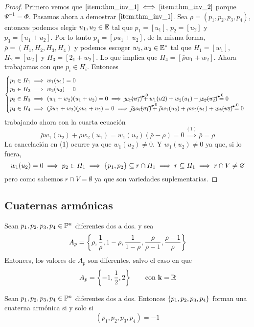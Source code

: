 \begin{proof}
 Primero vemos que $\ref{item:thm_inv_1} \iff \ref{item:thm_inv_2}$ porque $\Psi^{-1}=\Phi$. Pasamos ahora
 a demostrar $\ref{item:thm_inv_1}$. Sea $\rho = (p_1,p_2,p_3,p_4)$, entonces podemos elegir $u_1,u_2 \in \mathbb{E}$
 tal que $p_1 = [u_1]$, $p_2=[u_2]$ y $p_3=[u_1+u_2]$. Por lo tanto $p_4 = [\rho u_1+u_2]$, de la misma forma,
 $\bar{\rho} = (H_1,H_2,H_3,H_4)$ y podemos escoger $w_1,w_2 \in \mathbb{E}^*$ tal que $H_1 = [w_1]$, $H_2 = [w_2]$ y
 $H_3=[2_1+w_2]$. Lo que implica que $H_4 = [\bar{\rho} w_1 + w_2]$. Ahora trabajamos con que $p_i \in H_i$.
 Entonces
 \[
  \begin{cases}
    p_1 \in H_1 \implies w_1(u_1) = 0 \\
    p_2 \in H_2 \implies w_2(u_2) = 0 \\
    p_3 \in H_3 \implies (w_1+w_2)(u_1+u_2) = 0 \implies \cancelto{0}{w_1(u_1)} + w_1(u2) + w_2(u_1) + \cancelto{0}{w_2(u_2)} = 0 \\
    p_4 \in H_4 \implies (\bar{\rho}w_1+w_2)(\rho u_1+u_2) = 0 \implies \cancelto{0}{\bar{\rho}w_1(u_1)} + \bar{\rho}w_1(u_2) +
      \rho w_2(u_1) + \cancelto{0}{w_2(u_2)} = 0
  \end{cases}
 \]
 trabajando ahora con la cuarta ecuación
 \[
  \bar{\rho}w_1(u_2) + \rho w_2(u_1) = w_1(u_2)(\bar{\rho} - \rho) = 0 \stackrel{(1)}{\implies} \bar{\rho} = \rho
 \]
 La cancelación en (1) ocurre ya que $w_1(u_2) \neq 0$. Y $w_1(u_2) \neq 0$ ya que, si lo fuera,
 \[
  w_1(u_2) = 0 \implies p_2 \in H_1 \implies \left\{p_1,p_2\right\} \subseteq r \cap H_1 \implies r \subseteq H_1 \implies r \cap V \neq \varnothing
 \]
 pero como sabemos $r \cap V = \emptyset$ ya que son variedades suplementarias.
\end{proof}

\subsection{Cuaternas armónicas}

\begin{obs}
 Sean $p_1,p_2,p_3,p_4 \in \mathbb{P}^n$ diferentes dos a dos. y sea
 \[
  A_p = \left\{\rho, \frac{1}{\rho}, 1-\rho, \frac{1}{1-\rho}, \frac{\rho}{\rho-1},\frac{\rho-1}{\rho}\right\}
 \]
 Entonces, los valores de $A_p$ son diferentes, salvo el caso en que
 \[
  A_p = \left\{-1,\frac{1}{2},2\right\} \qquad \text{con $\mathbf{k} = \mathbb{R}$}
 \]
\end{obs}

\begin{defi}
 Sean $p_1,p_2,p_3,p_4 \in \mathbb{P}^n$ diferentes dos a dos. Entonces $\left\{p_1,p_2,p_3,p_4\right\}$ forman
 una cuaterna armónica si y solo si
 \[
  (p_1,p_2,p_3,p_4) = -1
 \]
\end{defi}

